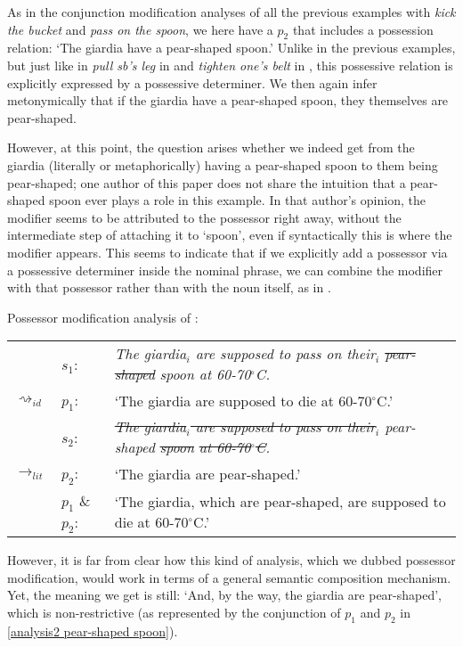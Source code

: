 \documentclass[output=paper]{langsci/langscibook}
\begin{document}
\noindent As in the conjunction modification analyses of all the previous examples with \textit{kick the bucket} and \textit{pass on the spoon}, we here have a $p_{2}$ that includes a possession relation: `The giardia have a pear-shaped spoon.' Unlike in the previous examples, %
but just like in \textit{pull sb's leg} in  and \textit{tighten one's belt} in , this possessive relation is explicitly expressed by a possessive determiner. We then again infer metonymically that if the giardia have a pear-shaped spoon, they themselves are pear-shaped.

However, at this point, the question arises whether we indeed get from the giardia (literally or metaphorically) having a pear-shaped spoon to them being pear-shaped; one author of this paper does not share the intuition that a pear-shaped spoon ever plays a role in this example. In that author's opinion, the modifier seems to be attributed to the possessor right away, without the intermediate step of attaching it to `spoon', even if syntactically this is where the modifier appears. This seems to indicate that if we explicitly add a possessor via a possessive determiner inside the nominal phrase, we can combine the modifier with that possessor rather than with the noun itself, as in .

\ea \label{analysis2 pear-shaped spoon} 
Possessor modification analysis of :\smallskip\\
\begin{tabularx}{\linewidth}{@{}llQ@{}}
& 	$s_{1}$: & \textit{The giardia$_{i}$ are supposed to pass on their$_{i}$ \sout{pear-shaped} spoon at 60-70$^\circ$C.} \\
$\rightsquigarrow_{id}$	&	$p_{1}$: &  `The giardia are supposed to die at 60-70$^\circ$C.'\medskip\\
& 	$s_{2}$: & \textit{\sout{The giardia$_{i}$ are supposed to pass on their}$_{i}$ pear-shaped \sout{spoon} \sout{at 60-70$^\circ$C}.} \\
$\rightarrow_{lit}$	&	$p_{2}$:  & `The giardia are pear-shaped.'\medskip\\
&	$p_{1}$ \& $p_{2}$: & `The giardia, which are pear-shaped, are supposed to die at 60-70$^\circ$C.' \\
\end{tabularx}
\z

\noindent However, it is far from clear how this kind of analysis, which we dubbed possessor modification, would work in terms of a general semantic composition mechanism. Yet, the meaning we get is still: `And, by the way, the giardia are pear-shaped', which is non-restrictive (as represented by the conjunction of $p_1$ and $p_2$ in \ref{analysis2 pear-shaped spoon}). 
\end{document}
